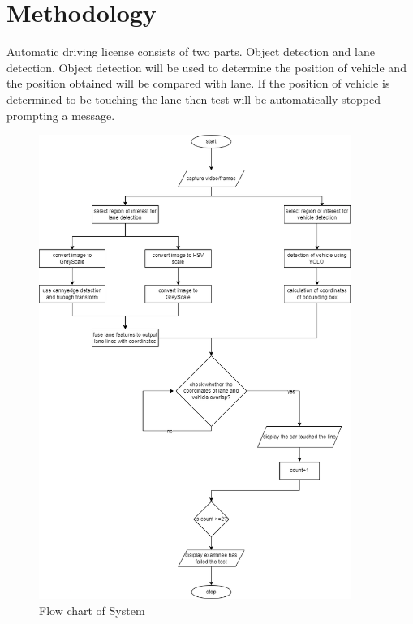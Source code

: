 \chapter{Methodology}
Automatic driving license consists of two parts. Object detection and lane detection. Object detection will be used to determine the position of vehicle and the position obtained will be compared with lane. If the position of vehicle is determined to be touching the lane then test will be automatically stopped prompting a message.  

\begin{figure}[tbh] %
\begin{center}
	\includegraphics[width = 4in]{images/system flowchart changed.png}
	\caption{Flow chart of System} %
	\label{figObjectDetectionusingYOLO} %
\end{center}
\end{figure}

